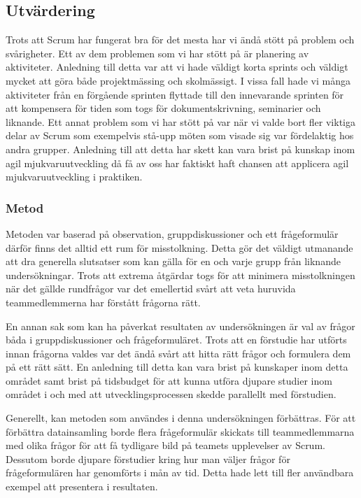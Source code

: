 \subsection{Utvärdering}
Trots att Scrum har fungerat bra för det mesta har vi ändå stött på problem och svårigheter. Ett av dem problemen som vi har stött på är planering av aktiviteter. Anledning till detta var att vi hade väldigt korta sprints och väldigt mycket att göra både projektmässing och skolmässigt. I vissa fall hade vi många aktiviteter från en förgående sprinten flyttade till den innevarande sprinten för att kompensera för tiden som togs för dokumentskrivning, seminarier och liknande. Ett annat problem som vi har stött på var när vi valde bort fler viktiga delar av Scrum som exempelvis stå-upp möten som visade sig var fördelaktig hos andra grupper. Anledning till att detta har skett kan vara brist på kunskap inom agil mjukvaruutveckling då få av oss har faktiskt haft chansen att applicera agil mjukvaruutveckling i praktiken. 

\subsubsection{Metod}
Metoden var baserad på observation, gruppdiskussioner och  ett frågeformulär därför finns det alltid ett rum för misstolkning. Detta gör det väldigt utmanande att dra generella slutsatser som kan gälla för en och varje grupp från liknande undersökningar. Trots att extrema åtgärdar togs för att minimera misstolkningen när det gällde rundfrågor var det emellertid svårt att veta huruvida teammedlemmerna har förstått frågorna rätt.

En annan sak som kan ha påverkat resultaten av undersökningen är val av frågor båda i gruppdiskussioner och frågeformuläret. Trots att en förstudie har utförts innan frågorna valdes var det ändå svårt att hitta rätt frågor och formulera dem på ett rätt sätt. En anledning till detta kan vara brist på kunskaper inom detta området samt brist på tidsbudget för att kunna utföra djupare studier inom området i och med att utvecklingsprocessen skedde parallellt med förstudien. 

Generellt, kan metoden som användes i denna undersökningen förbättras. För att förbättra datainsamling borde flera frågeformulär skickats till teammedlemmarna med olika frågor för att få tydligare bild på teamets upplevelser av Scrum. Dessutom borde djupare förstudier kring hur man väljer frågor för frågeformulären har genomförts i mån av tid. Detta hade lett till fler användbara exempel att presentera i resultaten. 

